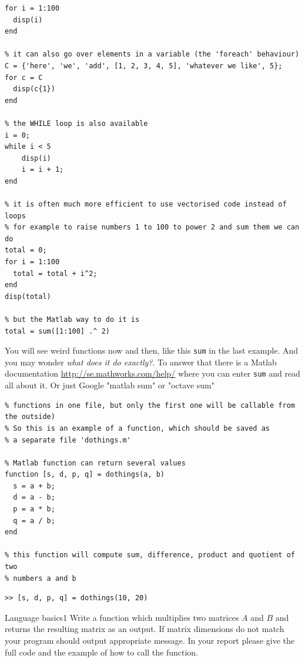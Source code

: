 \documentclass[a4paper,11pt]{article}
\begin{document}
\begin{lstlisting}[caption = {Loops}]
% FOR loop is the main guy
for i = 1:100
  disp(i)
end

% it can also go over elements in a variable (the 'foreach' behaviour)
C = {'here', 'we', 'add', [1, 2, 3, 4, 5], 'whatever we like', 5};
for c = C
  disp(c{1})
end

% the WHILE loop is also available
i = 0;
while i < 5
    disp(i)
    i = i + 1;
end

% it is often much more efficient to use vectorised code instead of loops
% for example to raise numbers 1 to 100 to power 2 and sum them we can do
total = 0;
for i = 1:100
  total = total + i^2;
end
disp(total)

% but the Matlab way to do it is
total = sum([1:100] .^ 2)
\end{lstlisting}

You will see weird functions now and then, like this \texttt{sum} in the last example. And you may wonder \emph{what does it do exactly?}. To answer that there is a Matlab documentation \url{http://se.mathworks.com/help/} where you can enter \texttt{sum} and read all about it. Or just Google "matlab sum" or "octave sum"

\begin{lstlisting}[caption = {Creating a function, file \texttt{dothings.m}}]
% Each function in Matlab lives in a separate file (you can have several
% functions in one file, but only the first one will be callable from the outside)
% So this is an example of a function, which should be saved as
% a separate file 'dothings.m'

% Matlab function can return several values
function [s, d, p, q] = dothings(a, b)
  s = a + b;
  d = a - b;
  p = a * b;
  q = a / b;
end

% this function will compute sum, difference, product and quotient of two
% numbers a and b
\end{lstlisting}

\begin{lstlisting}[caption = {Calling a function}]
% Now once we have our function defined and saved we can call it
>> [s, d, p, q] = dothings(10, 20)
\end{lstlisting}


%
%
\begin{exercise}{1}{Language basics}{1}
Write a function which multiplies two matrices $A$ and $B$ and returns the resulting matrix as an output. If matrix dimensions do not match your program should output appropriate message. In your report please give the full code and the example of how to call the function.
\end{exercise}
\end{document}
